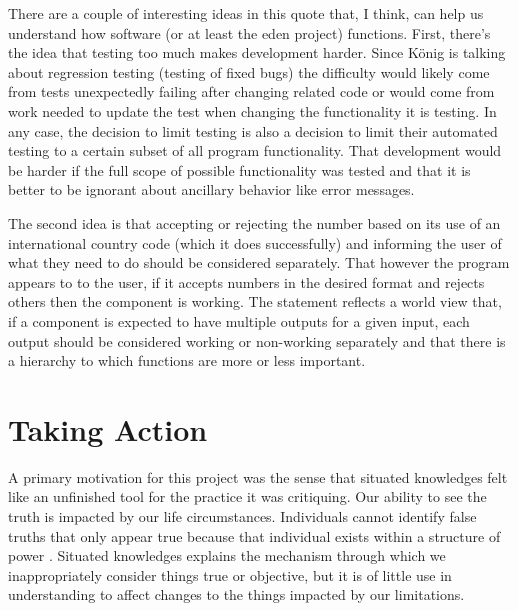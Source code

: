 \documentclass[a4paper,man,natbib,floatsintext]{apa6}
\begin{document}
   There are a couple of interesting ideas in this quote that, I think, can help us understand how software (or at least the \acrshort{eden} project) functions. First, there's the idea that testing too much makes development harder. Since K{\"o}nig is talking about regression testing (testing of fixed bugs) the difficulty would likely come from tests unexpectedly failing after changing related code or would come from work needed to update the test when changing the functionality it is testing. In any case, the decision to limit testing is also a decision to limit their automated testing to a certain subset of all program functionality. That development would be harder if the full scope of possible functionality was tested and that it is better to be ignorant about ancillary behavior like error messages.

   The second idea is that accepting or rejecting the number based on its use of an international country code (which it does successfully) and informing the user of what they need to do should be considered separately. That however the program appears to to the user, if it accepts numbers in the desired format and rejects others then the component is working. The statement reflects a world view that, if a component is expected to have multiple outputs for a given input, each output should be considered working or non-working separately and that there is a hierarchy to which functions are more or less important. 


  \section{Taking Action}
  A primary motivation for this project was the sense that situated knowledges felt like an unfinished tool for the practice it was critiquing. Our ability to see the truth is impacted by our life circumstances. Individuals cannot identify false truths that only appear true because that individual exists within a structure of power \citep{Haraway1988-nh}. Situated knowledges explains the mechanism through which we inappropriately consider things true or objective, but it is of little use in understanding to affect changes to the things impacted by our limitations. 
\end{document}
